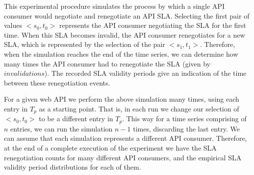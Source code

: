 This experimental procedure simulates the process by which a single API consumer would
negotiate and renegotiate an API SLA. Selecting the first pair of values $<s_{0},t_{0}>$ represents
the API consumer negotiating the SLA for the first time. When this SLA becomes invalid, the API consumer
renegotiates for a new SLA, which is represented by the selection of the pair $<s_{1},t_{1}>$. 
Therefore, when the simulation reaches the end of the time series, we can determine how many times the
API consumer had to renegotiate the SLA (given by $invalidations$). The
recorded SLA validity periods give an indication of the time between these renegotiation events.

For a given web API we perform the above simulation many times, using each entry in $T_{p}$ as
a starting point. That is, in each run we change our selection of $<s_{0},t_{0}>$ to be a different
entry in $T_{p}$. This way for a time series comprising of $n$ entries, we can run the simulation 
$n-1$ times, discarding the last entry. We can assume that each simulation represents a different API
consumer. Therefore, at the end of a complete execution of the experiment we have the SLA
renegotiation counts for many different API consumers, and the empirical SLA validity period distributions 
for each of them.